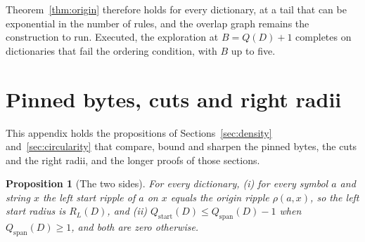 \documentclass[11pt,a4paper]{article}
\theoremstyle{definition}
\theoremstyle{plain}
\newtheorem{proposition}{Proposition}
\newcommand{\ripple}{R_{L}}
\begin{document}
Theorem~\ref{thm:origin} therefore holds for every dictionary, at a tail that can be exponential in the number of rules,
and the overlap graph remains the construction to run. Executed, the exploration at \(B = Q(D) + 1\) completes on
\CompletionUnordered{} dictionaries that fail the ordering condition, with \(B\) up to five.

\section{Pinned bytes, cuts and right radii}\label{app:windows}

This appendix holds the propositions of Sections~\ref{sec:density} and~\ref{sec:circularity} that compare, bound and
sharpen the pinned bytes, the cuts and the right radii, and the longer proofs of those sections.


\begin{proposition}[The two sides]\label{prop:sides}
For every dictionary, (i) for every symbol \(a\) and string \(x\) the left start ripple of \(a\) on \(x\) equals the
origin ripple \(\rho(a, x)\), so the left start radius is \(\ripple(D)\), and (ii)
\(Q_{\mathrm{start}}(D) \le Q_{\mathrm{span}}(D) - 1\) when \(Q_{\mathrm{span}}(D) \ge 1\), and both are zero otherwise.
\end{proposition}
\end{document}
